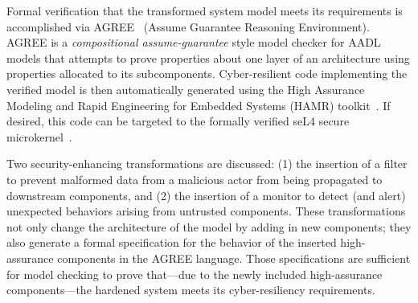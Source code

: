Formal
verification that the transformed system model meets its requirements
is accomplished via AGREE~\cite{agree2013} (Assume Guarantee Reasoning
Environment).
AGREE is a {\em compositional assume-guarantee} style model checker
for AADL models that attempts to prove properties about one layer of
an architecture using properties allocated to its subcomponents.
Cyber-resilient code implementing the verified model is then
automatically generated using the High Assurance Modeling and Rapid
Engineering for Embedded Systems (HAMR) toolkit~\cite{hamr}.  If
desired, this code can be targeted to the formally verified seL4
secure microkernel~\cite{sel4-2009}.


Two security-enhancing transformations are discussed: (1) the
insertion of a filter to prevent malformed data from a malicious actor
from being propagated to downstream components, and (2) the insertion
of a monitor to detect (and alert) unexpected behaviors arising from
untrusted components. These transformations not only change the
architecture of the model by adding in new components; they also
generate a formal specification for the behavior of the inserted
high-assurance components in the AGREE language. Those specifications
are sufficient for model checking to prove that---due to the newly
included high-assurance components---the hardened system meets its
cyber-resiliency requirements.

